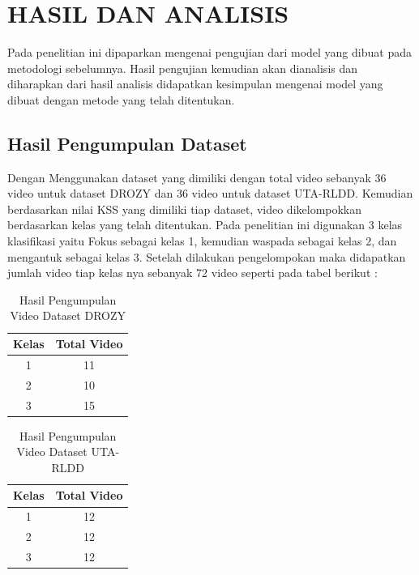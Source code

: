 \chapter{HASIL DAN ANALISIS}
\label{chap:pengujiananalisis}


Pada penelitian ini dipaparkan mengenai pengujian dari model yang dibuat pada metodologi sebelumnya. Hasil pengujian kemudian akan dianalisis dan diharapkan dari hasil analisis didapatkan kesimpulan mengenai model yang dibuat dengan metode yang telah ditentukan.

\section{Hasil Pengumpulan Dataset}
\label{sec:HasilPengumpulanDataset}
Dengan Menggunakan dataset yang dimiliki dengan total video sebanyak 36 video untuk dataset DROZY dan 36 video untuk dataset UTA-RLDD. Kemudian berdasarkan nilai KSS yang dimiliki tiap dataset, video dikelompokkan berdasarkan kelas yang telah ditentukan. Pada penelitian ini digunakan 3 kelas klasifikasi yaitu Fokus sebagai kelas 1, kemudian waspada sebagai kelas 2, dan mengantuk sebagai kelas 3. Setelah dilakukan pengelompokan maka didapatkan jumlah video tiap kelas nya sebanyak 72 video seperti pada tabel berikut :

\begin{longtable}{|c|c|}
  \caption{Hasil Pengumpulan Video Dataset DROZY}
  \label{tb:HasilDrozy}                                   \\
  \hline
  \rowcolor[HTML]{C0C0C0}
  \textbf{Kelas} & \textbf{Total Video} \\
  \hline
  1            & 11  \\              
  2            & 10  \\              
  3            & 15  \\                           
  \hline
\end{longtable}


\begin{longtable}{|c|c|}
  \caption{Hasil Pengumpulan Video Dataset UTA-RLDD}
  \label{tb:HasilUTA}                                   \\
  \hline
  \rowcolor[HTML]{C0C0C0}
  \textbf{Kelas} & \textbf{Total Video} \\
  \hline
  1            & 12  \\              
  2            & 12  \\              
  3            & 12  \\                           
  \hline
\end{longtable}

